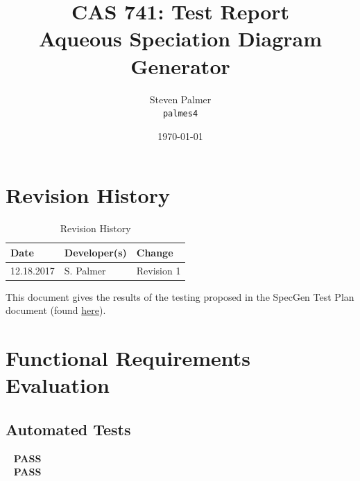 \documentclass[12pt, titlepage]{article}
\newcommand{\progname}{SpecGen}
\newcounter{testnum} %
\begin{document}

\title{CAS 741: Test Report\\[10pt]\Large Aqueous Speciation Diagram Generator}
\author{Steven Palmer\\\texttt{palmes4}}
\date{\today}
	
\maketitle


\setcounter{secnumdepth}{0}

\section{Revision History}

\begin{table}[hp]
\caption{Revision History} \label{TblRevisionHistory}
\begin{tabularx}{\textwidth}{llX}
\toprule
\textbf{Date} & \textbf{Developer(s)} & \textbf{Change}\\
\midrule
12.18.2017 & S. Palmer & Revision 1\\
\bottomrule
\end{tabularx}
\end{table}

\newpage

\tableofcontents


\newpage



\setcounter{secnumdepth}{3}

This document gives the results of the testing proposed in the
\progname{} Test Plan document (found 
\href{https://github.com/palmerst/cas741_sp/blob/master/Doc/TestPlan/TestPlan.pdf}{here}).


\section{Functional Requirements Evaluation}

\subsection{Automated Tests}
~
{\color{Green} \bf PASS}\\
~
{\color{Green} \bf PASS}
\end{document}
